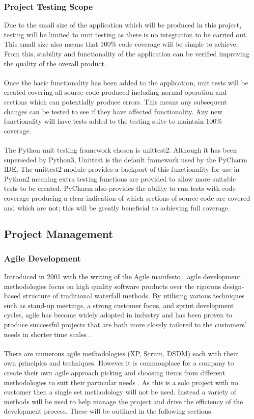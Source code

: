 	\subsubsection{Project Testing Scope}
		Due to the small size of the application which will be produced in this project, testing will be limited to unit testing as there is no integration to be carried out. This small size also means that 100\% code coverage will be simple to achieve. From this, stability and functionality of the application can be verified improving the quality of the overall product.
		\\\\
		Once the basic functionality has been added to the application, unit tests will be created covering all source code produced including normal operation and sections which can potentially produce errors. This means any subsequent changes  can be tested to see if they have affected functionality. Any new functionality will have tests added to the testing suite to maintain  100\% coverage.
		\\\\
		The Python unit testing framework chosen is unittest2. Although it has been superseded by Python3, Unittest is the default framework used by the PyCharm IDE. The unittest2 module provides a backport of this functionality for use in Python2 meaning extra testing functions are provided to allow more suitable tests to be created. PyCharm also provides the ability to run tests with code coverage producing a clear indication of which sections of source code are covered and which are not; this will be greatly beneficial to achieving  full coverage.
\subsection{Project Management}\label{sec:project_management}
	\subsubsection{Agile Development}
		Introduced in 2001 with the writing of the Agile manifesto \citep{beck2001manifesto}, agile development methodologies focus on high quality software products over the rigorous design-based structure of traditional waterfall methods. By utilising various techniques such as stand-up meetings, a strong customer focus, and sprint development cycles, agile has become widely adopted in industry and has been proven to produce successful projects that are both more closely tailored to the customers’ needs in shorter time scales \citep{state_of_agile_2015}.
		\\\\
		There are numerous agile methodologies (XP, Scrum, DSDM) each  with their own principles and techniques. However it is commonplace for a company to create their own agile approach  picking and choosing  items from different methodologies to suit their particular  needs . As this is a solo project with no customer then a single  set methodology will not be used. Instead a variety of methods will be used to  help  manage the project and drive the efficiency of the development process. These will be outlined in the following sections.

